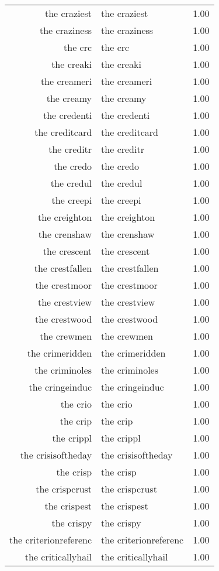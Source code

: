 \begin{table}[ht]
\begin{tabular}{rlr}
  the craziest & the craziest & 1.00 \\ 
  the craziness & the craziness & 1.00 \\ 
  the crc & the crc & 1.00 \\ 
  the creaki & the creaki & 1.00 \\ 
  the creameri & the creameri & 1.00 \\ 
  the creamy & the creamy & 1.00 \\ 
  the credenti & the credenti & 1.00 \\ 
  the creditcard & the creditcard & 1.00 \\ 
  the creditr & the creditr & 1.00 \\ 
  the credo & the credo & 1.00 \\ 
  the credul & the credul & 1.00 \\ 
  the creepi & the creepi & 1.00 \\ 
  the creighton & the creighton & 1.00 \\ 
  the crenshaw & the crenshaw & 1.00 \\ 
  the crescent & the crescent & 1.00 \\ 
  the crestfallen & the crestfallen & 1.00 \\ 
  the crestmoor & the crestmoor & 1.00 \\ 
  the crestview & the crestview & 1.00 \\ 
  the crestwood & the crestwood & 1.00 \\ 
  the crewmen & the crewmen & 1.00 \\ 
  the crimeridden & the crimeridden & 1.00 \\ 
  the criminoles & the criminoles & 1.00 \\ 
  the cringeinduc & the cringeinduc & 1.00 \\ 
  the crio & the crio & 1.00 \\ 
  the crip & the crip & 1.00 \\ 
  the crippl & the crippl & 1.00 \\ 
  the crisisoftheday & the crisisoftheday & 1.00 \\ 
  the crisp & the crisp & 1.00 \\ 
  the crispcrust & the crispcrust & 1.00 \\ 
  the crispest & the crispest & 1.00 \\ 
  the crispy & the crispy & 1.00 \\ 
  the criterionreferenc & the criterionreferenc & 1.00 \\ 
  the criticallyhail & the criticallyhail & 1.00 \\ 

\end{tabular}
\end{table}
